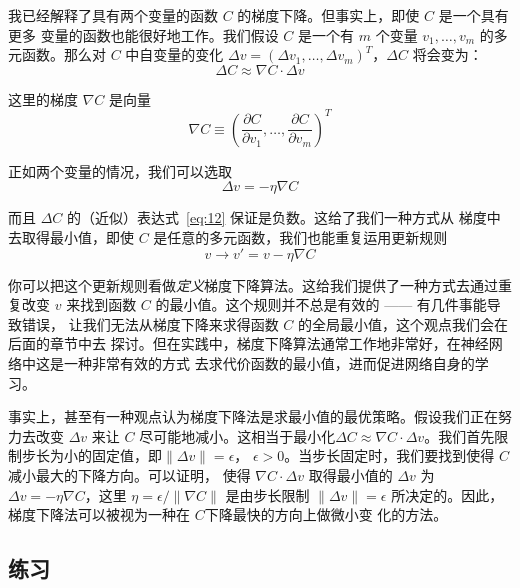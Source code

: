 我已经解释了具有两个变量的函数 $C$ 的梯度下降。但事实上，即使 $C$ 是一个具有更多
变量的函数也能很好地工作。我们假设 $C$ 是一个有 $m$ 个变量 $v_1,\ldots,v_m$ 的多
元函数。那么对 $C$ 中自变量的变化 $\Delta v = (\Delta v_1, \ldots, \Delta
v_m)^T$，$\Delta C$ 将会变为：
\begin{equation}
  \Delta C \approx \nabla C \cdot \Delta v
  \label{eq:12}\tag{12}
\end{equation}

这里的梯度 $\nabla C$ 是向量
\begin{equation}
  \nabla C \equiv \left(\frac{\partial C}{\partial v_1}, \ldots,
    \frac{\partial C}{\partial v_m}\right)^T
  \label{eq:13}\tag{13}
\end{equation}

正如两个变量的情况，我们可以选取
\begin{equation}
  \Delta v = -\eta \nabla C
  \label{eq:14}\tag{14}
\end{equation}

而且 $\Delta C$ 的（近似）表达式~\eqref{eq:12} 保证是负数。这给了我们一种方式从
梯度中去取得最小值，即使 $C$ 是任意的多元函数，我们也能重复运用更新规则
\begin{equation}
  v \rightarrow v' = v-\eta \nabla C
  \label{eq:15}\tag{15}
\end{equation}

你可以把这个更新规则看做\emph{定义}梯度下降算法。这给我们提供了一种方式去通过重
复改变 $v$ 来找到函数 $C$ 的最小值。这个规则并不总是有效的 —— 有几件事能导致错误，
让我们无法从梯度下降来求得函数 $C$ 的全局最小值，这个观点我们会在后面的章节中去
探讨。但在实践中，梯度下降算法通常工作地非常好，在神经网络中这是一种非常有效的方式
去求代价函数的最小值，进而促进网络自身的学习。

事实上，甚至有一种观点认为梯度下降法是求最小值的最优策略。假设我们正在努力去改变
$\Delta v$ 来让 $C$ 尽可能地减小。这相当于最小化$\Delta C \approx \nabla C \cdot
\Delta v$。我们首先限制步长为小的固定值，即$\| \Delta v \| = \epsilon$，
$\epsilon > 0$。当步长固定时，我们要找到使得 $C$ 减小最大的下降方向。可以证明，
使得 $\nabla C \cdot \Delta v$ 取得最小值的 $\Delta v$ 为 $\Delta v = - \eta
\nabla C$，这里 $\eta = \epsilon / \|\nabla C\|$ 是由步长限制 $\|\Delta v\| =
\epsilon$ 所决定的。因此，梯度下降法可以被视为一种在 $C$下降最快的方向上做微小变
化的方法。

\subsection*{练习}

